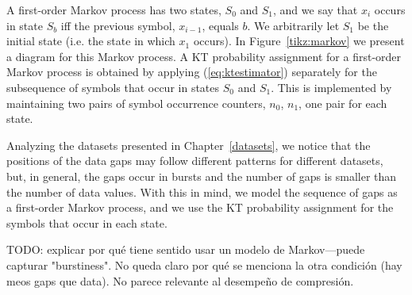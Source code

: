 \vspace{+5pt}
\begin{table}[h]
\begin{minipage}{0.62\textwidth}
A first-order Markov process has two states, $S_0$ and $S_1$, and we say that $x_i$ occurs in state $S_b$ iff the previous symbol, $x_{i-1}$, equals $b$. We arbitrarily let $S_1$ be the initial state (i.e. the state in which $x_1$ occurs). In Figure~\ref{tikz:markov} we present a diagram for this Markov process. A KT probability assignment for a first-order Markov process is obtained by applying (\ref{eq:ktestimator}) separately for the subsequence of symbols that occur in states $S_0$ and $S_1$. This is implemented by maintaining two pairs of symbol occurrence counters, $n_0$, $n_1$, one pair for each state.

\end{minipage}
\hspace{0.02\textwidth}
\begin{minipage}{0.32\textwidth}

\end{minipage}
\end{table}


Analyzing the datasets presented in Chapter~\ref{datasets}, we notice that the positions of the data gaps may follow different patterns for different datasets, but, in general, the gaps occur in bursts and the number of gaps is smaller than the number of data values. With this in mind, we model the sequence of gaps as a first-order Markov process, and we use the KT probability assignment for the symbols that occur in each state.

TODO: explicar por qué tiene sentido usar un modelo de Markov---puede capturar "burstiness". No queda claro por qué se menciona la otra condición (hay meos gaps que data). No parece relevante al desempeño de compresión.

